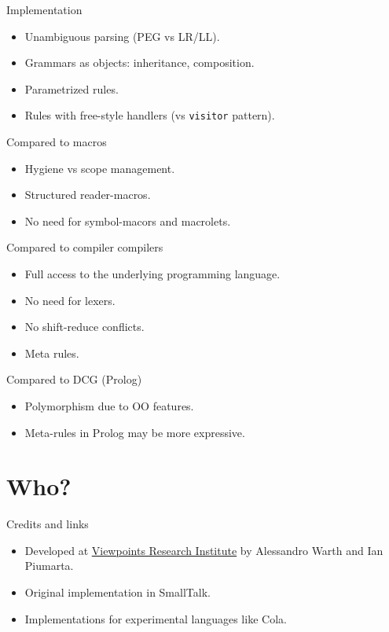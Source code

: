 \documentclass[presentation,10pt]{beamer}
\begin{document}
\begin{frame}[fragile,label=sec-2-2]{Implementation}
 \begin{itemize}
\item Unambiguous parsing (PEG vs LR/LL).
\item Grammars as objects: inheritance, composition.
\item Parametrized rules.
\item Rules with free-style handlers (vs \texttt{visitor} pattern).
\end{itemize}
\end{frame}

\begin{frame}[label=sec-2-3]{Compared to macros}
\begin{itemize}
\item Hygiene vs scope management.
\item Structured reader-macros.
\item No need for symbol-macors and macrolets.
\end{itemize}
\end{frame}

\begin{frame}[label=sec-2-4]{Compared to compiler compilers}
\begin{itemize}
\item Full access to the underlying programming language.
\item No need for lexers.
\item No shift-reduce conflicts.
\item Meta rules.
\end{itemize}
\end{frame}

\begin{frame}[label=sec-2-5]{Compared to DCG (Prolog)}
\begin{itemize}
\item Polymorphism due to OO features.
\item Meta-rules in Prolog may be more expressive.
\end{itemize}
\end{frame}

\section{Who?}
\label{sec-3}

\begin{frame}[label=sec-3-1]{Credits and links}
\begin{itemize}
\item Developed at \href{http://vpri.org/index.html}{Viewpoints Research Institute} by Alessandro Warth
and Ian Piumarta.
\item Original implementation in SmallTalk.
\item Implementations for experimental languages like Cola.
\end{itemize}
\end{frame}
\end{document}

